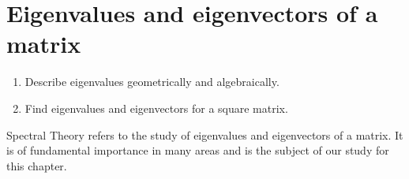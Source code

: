 \section{Eigenvalues and eigenvectors of a matrix}

\begin{outcome}
  \begin{enumerate}
  \item Describe eigenvalues geometrically and algebraically.
  \item Find eigenvalues and eigenvectors for a square matrix.
  \end{enumerate}
\end{outcome}

Spectral Theory refers to the study of eigenvalues and eigenvectors of
a matrix. It is of fundamental importance in many areas and is the
subject of our study for this chapter.
